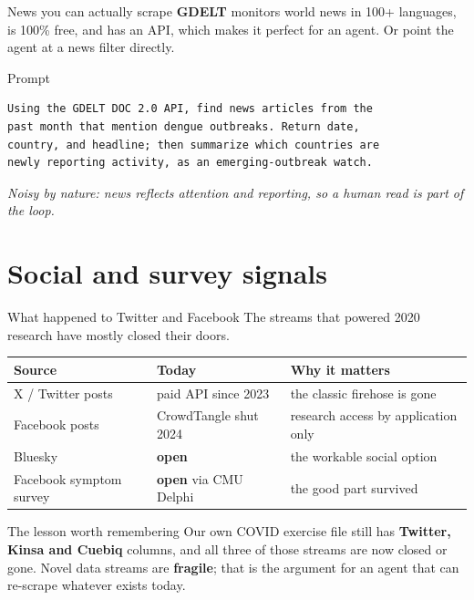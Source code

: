 \documentclass[aspectratio=169,11pt]{beamer}
\begin{document}
\begin{frame}[fragile]{News you can actually scrape}
  \textbf{GDELT} monitors world news in 100+ languages, is 100\% free, and has an API,
  which makes it perfect for an agent. Or point the agent at a news filter directly.
  \begin{block}{Prompt}
  \begin{lstlisting}
Using the GDELT DOC 2.0 API, find news articles from the
past month that mention dengue outbreaks. Return date,
country, and headline; then summarize which countries are
newly reporting activity, as an emerging-outbreak watch.
  \end{lstlisting}
  \end{block}
  \begin{center}
    \itshape Noisy by nature: news reflects attention and reporting, so a human read is part
    of the loop.
  \end{center}
\end{frame}

\section{Social and survey signals}

\begin{frame}{What happened to Twitter and Facebook}
  The streams that powered 2020 research have mostly closed their doors.
  \begin{center}
  \footnotesize
  \begin{tabular}{lll}
    \hline
    \textbf{Source} & \textbf{Today} & \textbf{Why it matters} \\
    \hline
    X / Twitter posts      & paid API since 2023   & the classic firehose is gone \\
    Facebook posts         & CrowdTangle shut 2024 & research access by application only \\
    Bluesky                & \textbf{open}         & the workable social option \\
    Facebook symptom survey & \textbf{open} via CMU Delphi & the good part survived \\
    \hline
  \end{tabular}
  \end{center}
  \vspace{0.3em}
  \begin{alertblock}{The lesson worth remembering}
    Our own COVID exercise file still has \textbf{Twitter, Kinsa and Cuebiq} columns, and all
    three of those streams are now closed or gone. Novel data streams are \textbf{fragile};
    that is the argument for an agent that can re-scrape whatever exists today.
  \end{alertblock}
\end{frame}
\end{document}
